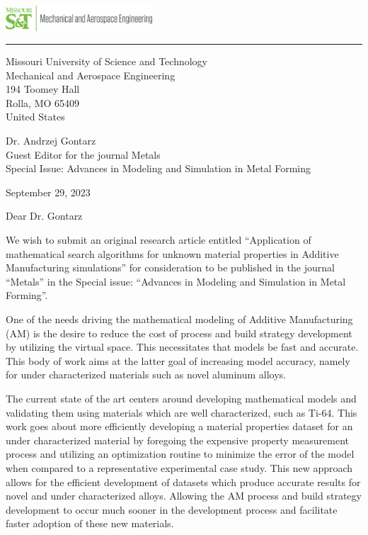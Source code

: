 \documentclass{letter}
\begin{document}
\vspace*{-2cm}
\hfill\includegraphics[width=0.41\textwidth]{mstLogo.png}
\vspace{-0.95cm}
\rule{\linewidth}{1pt}
\medskip


\begingroup
	\raggedleft %
	\small %
	Missouri University of Science and Technology\\
	Mechanical and Aerospace Engineering\\
	194 Toomey Hall\\
	Rolla, MO 65409\\
	United States\\
\endgroup


\begingroup
	Dr. Andrzej Gontarz \\
	Guest Editor for the journal Metals \\
	Special Issue: Advances in Modeling and Simulation in Metal Forming
\endgroup


September 29, 2023


Dear Dr. Gontarz

\smallskip %

We wish to submit an original research article entitled ``Application of mathematical search algorithms for unknown material properties in Additive Manufacturing simulations'' for consideration to be published in the journal ``Metals'' in the Special issue: ``Advances in Modeling and Simulation in Metal Forming''.

One of the needs driving the mathematical modeling of Additive Manufacturing (AM) is the desire to reduce the cost of process and build strategy development by utilizing the virtual space.  This necessitates that models be fast and accurate.  This body of work aims at the latter goal of increasing model accuracy, namely for under characterized materials such as novel aluminum alloys.  

The current state of the art centers around developing mathematical models and validating them using materials which are well characterized, such as Ti-64.  This work goes about more efficiently developing a material properties dataset for an under characterized material by foregoing the expensive property measurement process and utilizing an optimization routine to minimize the error of the model when compared to a representative experimental case study.  This new approach allows for the efficient development of datasets which produce accurate results for novel and under characterized alloys.  Allowing the AM process and build strategy development to occur much sooner in the development process and facilitate faster adoption of these new materials.
\end{document}
